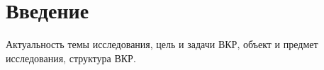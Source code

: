 \section*{\centering Введение}

Актуальность темы исследования, цель и задачи ВКР, объект и предмет исследования, структура ВКР.

\newpage